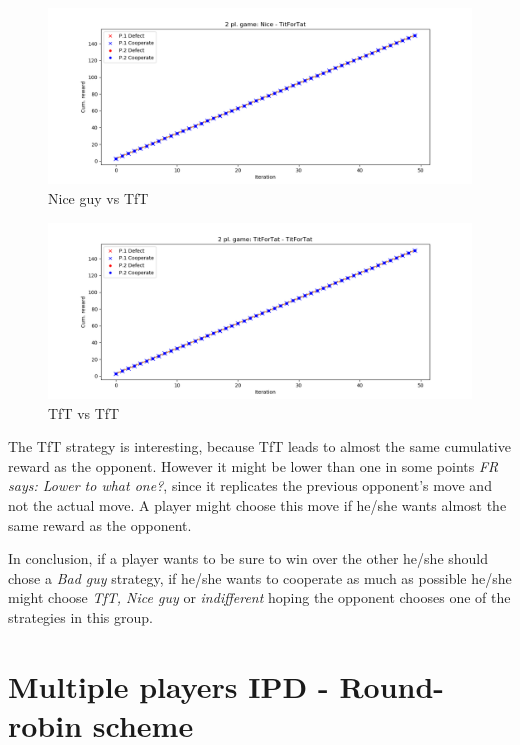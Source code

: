 \documentclass[journal,a4paper,10pt,twoside]{IEEEtran}
\newcommand{\FR}[1]{\textit{\color{ForestGreen}FR says: #1}}
\begin{document}
\begin{figure}[ht]
    \centering
    \includegraphics[width=1\columnwidth]{../img_v1/idp2p-rewards-Nice-TitForTat.png}
    \caption{Nice guy vs TfT}
    \label{fig:nicevstft}
\end{figure}

\begin{figure}[ht]
    \centering
    \includegraphics[width=1\columnwidth]{../img_v1/idp2p-rewards-TitForTat-TitForTat.png}
    \caption{TfT vs TfT}
    \label{fig:tftvstft}
\end{figure}

The TfT strategy is interesting, because TfT leads to almost the same cumulative reward as the opponent.
However it might be lower than one in some points \FR{Lower to \emph{what} one?}, since it replicates the previous opponent's move and not the actual move.
A player might choose this move if he/she wants almost the same reward as the opponent.

In conclusion, if a player wants to be sure to win over the other he/she should chose a \textit{Bad guy} strategy, if he/she wants to cooperate as much as possible he/she might choose \textit{TfT, Nice guy} or \textit{indifferent} hoping the opponent chooses one of the strategies in this group.     

\section{Multiple players IPD - Round-robin scheme} \label{s:IPDMP}
\end{document}
